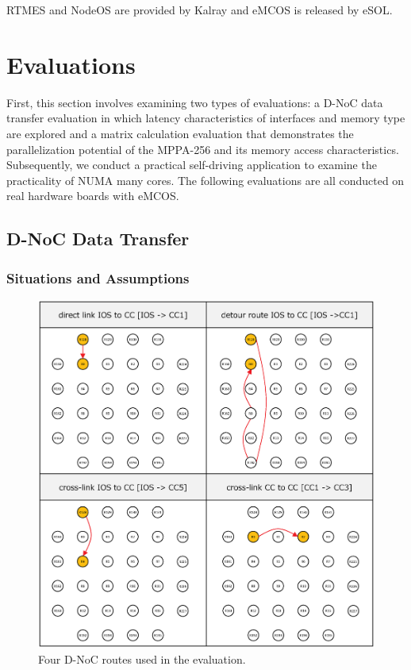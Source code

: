 RTMES and NodeOS are provided by Kalray and eMCOS is released by eSOL.

\chapter{Evaluations}
\label{sec:evaluations}
First, this section involves examining two types of evaluations: a D-NoC data transfer evaluation in which latency characteristics of interfaces and memory type are explored and a matrix calculation evaluation that demonstrates the parallelization potential of the MPPA-256 and its memory access characteristics.
Subsequently, we conduct a practical self-driving application to examine the practicality of NUMA many cores.
The following evaluations are all conducted on real hardware boards with eMCOS.

\section{D-NoC Data Transfer}
\label{sec:dnoc_eval}

\subsection{Situations and Assumptions}
\label{sec:situations_and_assumptions}

\begin{figure}[!htbp]
  \centering
  \includegraphics[width=0.5\linewidth]{../figure/noc_routes_old.eps}
      \caption{\label{fig:noc_routes}
    Four D-NoC routes used in the evaluation.}
\end{figure}

